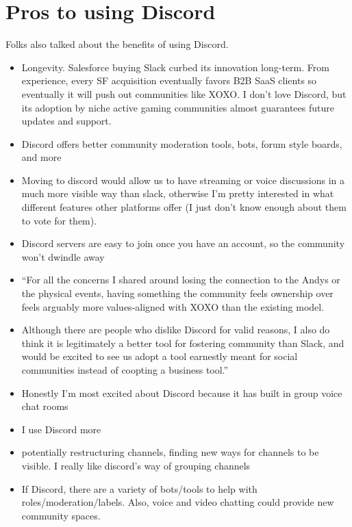 \documentclass[
]{book}
\providecommand{\tightlist}{%
  \setlength{\itemsep}{0pt}\setlength{\parskip}{0pt}}
\begin{document}
\section{Pros to using Discord}\label{pros-to-using-discord}

Folks also talked about the benefits of using Discord.

\begin{itemize}
\tightlist
\item
  Longevity. Salesforce buying Slack curbed its innovation long-term. From experience, every SF acquisition eventually favors B2B SaaS clients so eventually it will push out communities like XOXO. I don't love Discord, but its adoption by niche active gaming communities almost guarantees future updates and support.
\item
  Discord offers better community moderation tools, bots, forum style boards, and more
\item
  Moving to discord would allow us to have streaming or voice discussions in a much more visible way than slack, otherwise I'm pretty interested in what different features other platforms offer (I just don't know enough about them to vote for them).
\item
  Discord servers are easy to join once you have an account, so the community won't dwindle away
\item
  ``For all the concerns I shared around losing the connection to the Andys or the physical events, having something the community feels ownership over feels arguably more values-aligned with XOXO than the existing model.
\item
  Although there are people who dislike Discord for valid reasons, I also do think it is legitimately a better tool for fostering community than Slack, and would be excited to see us adopt a tool earnestly meant for social communities instead of coopting a business tool.''
\item
  Honestly I'm most excited about Discord because it has built in group voice chat rooms
\item
  I use Discord more
\item
  potentially restructuring channels, finding new ways for channels to be visible. I really like discord's way of grouping channels
\item
  If Discord, there are a variety of bots/tools to help with roles/moderation/labels. Also, voice and video chatting could provide new community spaces.
\end{itemize}
\end{document}
